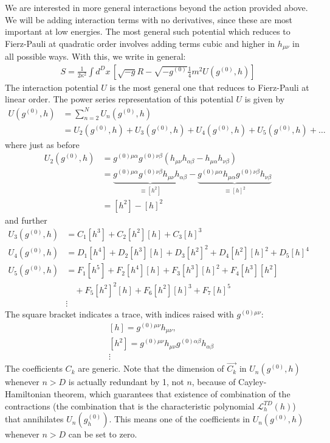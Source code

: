 \documentclass{book}
\theoremstyle{definition}
\newcommand{\lag}{\mathcal{L}}
\newcommand{\nn}{\nonumber}
\newcommand{\f}[2]{\frac{#1}{#2}}
\newcommand{\lp}{\left(}
\newcommand{\rp}{\right)}
\newcommand{\lb}{\left[}
\newcommand{\rb}{\right]}
\begin{document}
We are interested in more general interactions beyond the action provided above. We will be adding interaction terms with no derivatives, since these are most important at low energies. The most general such potential which reduces to Fierz-Pauli at quadratic order involves adding terms cubic and higher in $h_{\mu\nu}$ in all possible ways. With this, we write in general:
\begin{align}
\boxed{S = \f{1}{2\kappa^2}\int d^Dx\, \lb \sqrt{-g}R - \sqrt{-g^{(0)}}\f{1}{4}m^2 U(g^{(0)},h) \rb}
\end{align}
The interaction potential $U$ is the most general one that reduces to Fierz-Pauli at linear order. The power series representation of this potential $U$ is given by
\begin{align}
U(g^{(0)},h) &= \sum^N_{n=2}U_n(g^{(0)},h) \nn\\
&= U_2(g^{(0)},h) + U_3(g^{(0)},h) + U_4(g^{(0)},h) + U_5(g^{(0)},h) + \dots
\end{align}
where just as before
\begin{align}
U_2(g^{(0)},h) &= g^{(0)\mu\alpha}g^{(0)\nu\beta}\lp h_{\mu\nu}h_{\alpha\beta} - h_{\mu\alpha}h_{\nu\beta} \rp   \nn\\
&= \underbrace{g^{(0)\mu\alpha}g^{(0)\nu\beta}h_{\mu\nu}h_{\alpha\beta}}_{\equiv [h^2]} - \underbrace{g^{(0)\mu\alpha}h_{\mu\alpha}g^{(0)\nu\beta}h_{\nu\beta}}_{\equiv [h]^2}\nn\\
&= [h^2] - [h]^2
\end{align}
and further
\begin{align}
U_3(g^{(0)},h) &= C_1[h^3] + C_2[h^2][h] + C_3[h]^3\nn\\
U_4(g^{(0)},h) &= D_1[h^4] + D_2[h^3][h] + D_3[h^2]^2 + D_4[h^2][h]^2 + D_5[h]^4\nn\\
U_5(g^{(0)},h) &= F_1[h^5] + F_2[h^4][h] + F_3[h^3][h]^2 + F_4[h^3][h^2]\nn\\ &\,\,\,\,\,\,+ F_5[h^2]^2[h] + F_6[h^2][h]^3 + F_7[h]^5\nn\\
&\vdots
\end{align}
The square bracket indicates a trace, with indices raised with $g^{(0)\mu\nu}$:
\begin{align}
&[h] = g^{(0)\mu\nu}h_{\mu\nu},\nn\\
&[h^2] = g^{(0)\mu\nu}h_{\mu\nu}g^{(0)\alpha\beta}h_{\alpha\beta} \nn\\
&\vdots
\end{align}
The coefficients $C_k$ are generic. Note that the dimension of $\vec{C_k}$ in $U_n(g^{(0)},h)$ whenever $n>D$ is actually redundant by 1, not $n$, because of Cayley-Hamiltonian theorem, which guarantees that existence of combination of the contractions (the combination that is the characteristic polynomial $\lag_h^{TD}(h)$) that annihilates $U_n(g^{(0)}_h)$. This means one of the coefficients in $U_n(g^{(0)},h)$ whenever $n>D$ can be set to zero. \\
\end{document}
